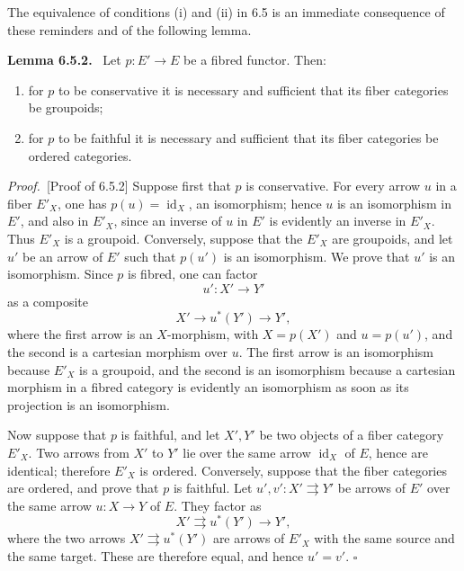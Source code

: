 \documentclass[11pt]{article}
\newcommand{\id}{\operatorname{id}}
\newcommand{\qedtext}{\hfill\(\square\)}
\newenvironment{statement}[1]{\par\medskip\noindent\textbf{#1.}\ }{\par\medskip}
\newenvironment{proofsketch}{\par\noindent\emph{Proof.}\ }{\par\medskip}
\begin{document}
The equivalence of conditions (i) and (ii) in 6.5 is an immediate consequence of these reminders and of the following lemma.

\begin{statement}{Lemma 6.5.2}
Let $p:E'\to E$ be a fibred functor. Then:
\begin{enumerate}[label=(\roman*)]
\item for $p$ to be conservative it is necessary and sufficient that its fiber categories be groupoids;
\item for $p$ to be faithful it is necessary and sufficient that its fiber categories be ordered categories.
\end{enumerate}
\end{statement}

\begin{proofsketch}[Proof of 6.5.2]
Suppose first that $p$ is conservative. For every arrow $u$ in a fiber $E'_X$, one has $p(u)=\id_X$, an isomorphism; hence $u$ is an isomorphism in $E'$, and also in $E'_X$, since an inverse of $u$ in $E'$ is evidently an inverse in $E'_X$. Thus $E'_X$ is a groupoid. Conversely, suppose that the $E'_X$ are groupoids, and let $u'$ be an arrow of $E'$ such that $p(u')$ is an isomorphism. We prove that $u'$ is an isomorphism. Since $p$ is fibred, one can factor
\[
u':X'\longrightarrow Y'
\]
as a composite
\[
X'\longrightarrow u^*(Y')\longrightarrow Y',
\]
where the first arrow is an $X$-morphism, with $X=p(X')$ and $u=p(u')$, and the second is a cartesian morphism over $u$. The first arrow is an isomorphism because $E'_X$ is a groupoid, and the second is an isomorphism because a cartesian morphism in a fibred category is evidently an isomorphism as soon as its projection is an isomorphism.

Now suppose that $p$ is faithful, and let $X',Y'$ be two objects of a fiber category $E'_X$. Two arrows from $X'$ to $Y'$ lie over the same arrow $\id_X$ of $E$, hence are identical; therefore $E'_X$ is ordered. Conversely, suppose that the fiber categories are ordered, and prove that $p$ is faithful. Let $u',v':X'\rightrightarrows Y'$ be arrows of $E'$ over the same arrow $u:X\to Y$ of $E$. They factor as
\[
X'\rightrightarrows u^*(Y')\longrightarrow Y',
\]
where the two arrows $X'\rightrightarrows u^*(Y')$ are arrows of $E'_X$ with the same source and the same target. These are therefore equal, and hence $u'=v'$. \qedtext
\end{proofsketch}
\end{document}
